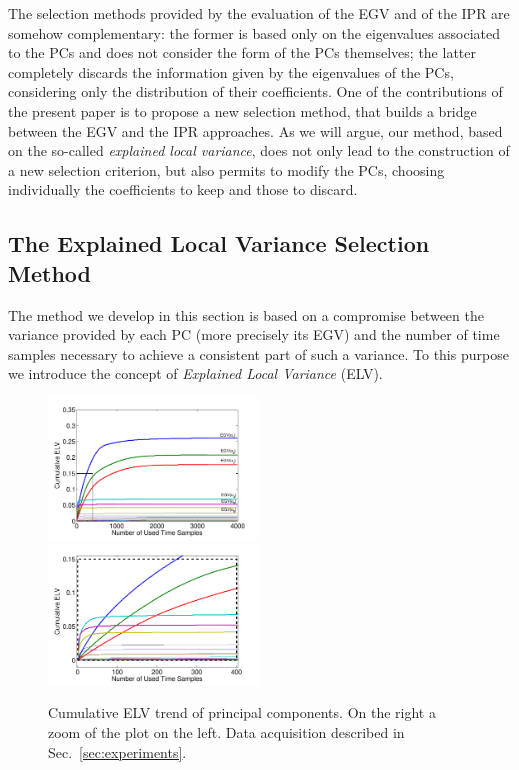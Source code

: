 The selection methods provided by the evaluation of the EGV and of the IPR are somehow complementary: the former is based only on the eigenvalues associated to the PCs and does not consider the form of the PCs themselves; the latter completely discards the information given by the eigenvalues of the PCs, considering only the distribution of their coefficients. One of the contributions of the present paper is to propose a new selection method, that builds a bridge between the EGV and the IPR approaches. As we will argue, our method, based on the so-called {\em explained local variance}, does not only lead to the construction of a new selection criterion, but also permits  to modify the PCs, choosing individually the coefficients to keep and those to discard. 

\subsection{The Explained Local Variance Selection Method}
The method we develop in this section is based on a compromise between the variance provided by each PC (more precisely its EGV) and the number of time samples necessary to achieve a consistent part of such a variance. To this purpose we  introduce the concept of {\em Explained Local Variance} (ELV).
\begin{figure}
\includegraphics[width=0.5\textwidth]{../Figures/CARDIS2015/cumulativeELVallRectangle.pdf} 
\includegraphics[width=0.5\textwidth]{../Figures/CARDIS2015/cumulativeELVzoomedRectangle.pdf} 
\caption[Cumulative ELV trend of principal components.]{Cumulative ELV trend of principal components. On the right a zoom of the plot on the left. Data acquisition described in Sec.~\ref{sec:experiments}.}\label{fig:ELVcumulative}
\end{figure}
